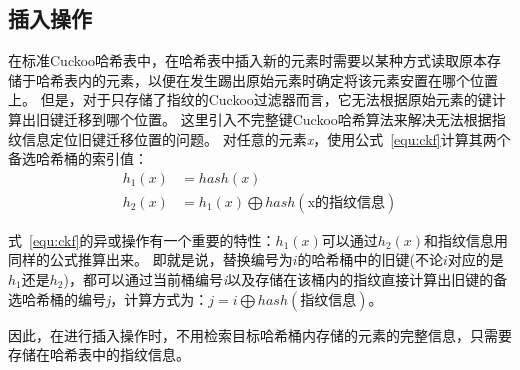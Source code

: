 \subsection{插入操作}
在标准Cuckoo哈希表中，在哈希表中插入新的元素时需要以某种方式读取原本存储于哈希表内的元素，以便在发生踢出原始元素时确定将该元素安置在哪个位置上。
但是，对于只存储了指纹的Cuckoo过滤器而言，它无法根据原始元素的键计算出旧键迁移到哪个位置。
这里引入不完整键Cuckoo哈希算法来解决无法根据指纹信息定位旧键迁移位置的问题。
对任意的元素\textit{x}，使用公式~\ref{equ:ckf}计算其两个备选哈希桶的索引值：
\begin{equation}
\begin{split}
h_1\left(x\right) &= hash\left(x\right) \\
h_2(x) &= h_1(x)\bigoplus hash(\text{x的指纹信息})
\end{split}
\label{equ:ckf}
\end{equation}

式~\ref{equ:ckf}的异或操作有一个重要的特性：$h_1(x)$可以通过$h_2(x)$和指纹信息用同样的公式推算出来。
即就是说，替换编号为$i$的哈希桶中的旧键(不论$i$对应的是$h_1$还是$h_2$)，都可以通过当前桶编号\textit{i}以及存储在该桶内的指纹直接计算出旧键的备选哈希桶的编号\textit{j}，计算方式为：$j = i \bigoplus hash(\text{指纹信息})$。

因此，在进行插入操作时，不用检索目标哈希桶内存储的元素的完整信息，只需要存储在哈希表中的指纹信息。

